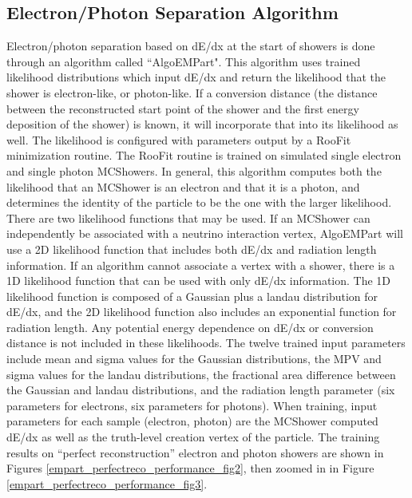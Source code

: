 \subsection{Electron/Photon Separation Algorithm}\label{algoempart_section}
Electron/photon separation based on dE/dx at the start of showers is done through an algorithm called ``AlgoEMPart". This algorithm uses trained likelihood distributions which input dE/dx and return the likelihood that the shower is electron-like, or photon-like. If a conversion distance (the distance between the reconstructed start point of the shower and the first energy deposition of the shower) is known, it will incorporate that into its likelihood as well. The likelihood is configured with parameters output by a RooFit \cite{ROOFITsource} minimization routine. The RooFit routine is trained on simulated single electron and single photon {\sc MCShowers}. In general, this algorithm computes both the likelihood that an {\sc MCShower} is an electron and that it is a photon, and determines the identity of the particle to be the one with the larger likelihood.\\

There are two likelihood functions that may be used. If an {\sc MCShower} can independently be associated with a neutrino interaction vertex, AlgoEMPart will use a 2D likelihood function that includes both dE/dx and radiation length information. If an algorithm cannot associate a vertex with a shower, there is a 1D likelihood function that can be used with only dE/dx information. The 1D likelihood function is composed of a Gaussian plus a landau distribution for dE/dx, and the 2D likelihood function also includes an exponential function for radiation length. Any potential energy dependence on dE/dx or conversion distance is not included in these likelihoods. The twelve trained input parameters include mean and sigma values for the Gaussian distributions, the MPV and sigma values for the landau distributions, the fractional area difference between the Gaussian and landau distributions, and the radiation length parameter (six parameters for electrons, six parameters for photons). When training, input parameters for each sample (electron, photon) are the {\sc MCShower} computed dE/dx as well as the truth-level creation vertex of the particle. The training results on ``perfect reconstruction'' electron and photon showers are shown in Figures \ref{empart_perfectreco_performance_fig2}, then zoomed in in Figure \ref{empart_perfectreco_performance_fig3}.

